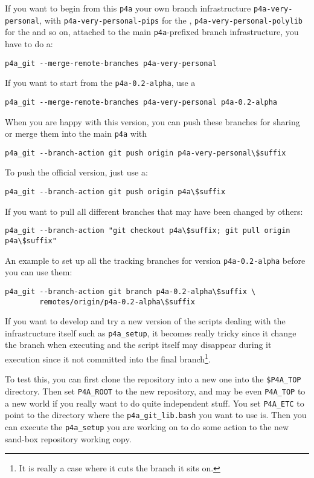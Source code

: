 \documentclass[a4paper]{article}
\begin{document}
If you want to begin from this \texttt{p4a} your own branch infrastructure
\verb|p4a-very-personal|, with \verb|p4a-very-personal-pips| for the
\Apips, \verb|p4a-very-personal-polylib| for the \Apolylib and so on,
attached to the main \verb|p4a|-prefixed branch infrastructure, you have
to do a:
\begin{verbatim}
p4a_git --merge-remote-branches p4a-very-personal
\end{verbatim}

If you want to start from the \texttt{p4a-0.2-alpha}, use a
\begin{verbatim}
p4a_git --merge-remote-branches p4a-very-personal p4a-0.2-alpha
\end{verbatim}

When you are happy with this version, you can push these branches for
sharing or merge them into the main \Apfa \texttt{p4a} with
\begin{verbatim}
p4a_git --branch-action git push origin p4a-very-personal\$suffix
\end{verbatim}

To push the official version, just use a:
\begin{verbatim}
p4a_git --branch-action git push origin p4a\$suffix
\end{verbatim}

If you want to pull all different \Apfa branches that may have been
changed by others:
\begin{verbatim}
p4a_git --branch-action "git checkout p4a\$suffix; git pull origin p4a\$suffix"
\end{verbatim}

An example to set up all the tracking branches for version
\texttt{p4a-0.2-alpha} before you can use them:
\begin{verbatim}
p4a_git --branch-action git branch p4a-0.2-alpha\$suffix \
        remotes/origin/p4a-0.2-alpha\$suffix
\end{verbatim}
\texttt{}
If you want to develop and try a new version of the scripts dealing with
the \Apfa infrastructure itself such as \verb|p4a_setup|, it becomes
really tricky since it change the branch when executing and the script
itself may disappear during it execution since it not committed into the
final branch\footnote{It is really a case where it cuts the branch it sits
on. \smiley}.

To test this, you can first clone the repository into a new one into the
\verb|$P4A_TOP| %
directory. Then set \verb|P4A_ROOT| to the new repository,
and may be even \verb|P4A_TOP| to a new world if you really want to do
quite independent stuff. You set \verb|P4A_ETC| to point to the directory
where the \verb|p4a_git_lib.bash| you want to use is. Then you can execute
the \verb|p4a_setup| you are working on to do some action to the new
sand-box repository working copy.
\end{document}
